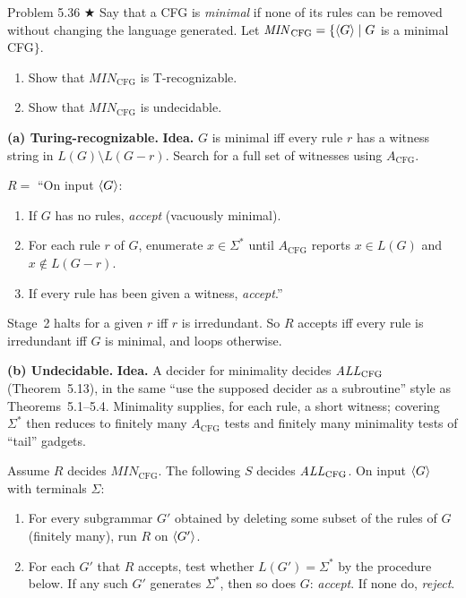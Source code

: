 \begin{question}{Problem 5.36 $\bigstar$}
Say that a CFG is \emph{minimal} if none of its rules can be removed without changing the language generated. Let $\mathit{MIN}_{\mathrm{CFG}}=\{\langle G\rangle\mid G$ is a minimal CFG$\}$.
\begin{enumerate}[label=\alph*.]
\item Show that $\mathit{MIN}_{\mathrm{CFG}}$ is T-recognizable.
\item Show that $\mathit{MIN}_{\mathrm{CFG}}$ is undecidable.
\end{enumerate}
\end{question}
\begin{soln}
\textbf{(a) Turing-recognizable.}
\textbf{Idea.} $G$ is minimal iff every rule $r$ has a witness string in $L(G)\setminus L(G-r)$. Search for a full set of witnesses using $A_{\mathrm{CFG}}$.

$R=$ ``On input $\langle G\rangle$:
\begin{enumerate}
\item If $G$ has no rules, \emph{accept} (vacuously minimal).
\item For each rule $r$ of $G$, enumerate $x\in\Sigma^*$ until $A_{\mathrm{CFG}}$ reports $x\in L(G)$ and $x\notin L(G-r)$.
\item If every rule has been given a witness, \emph{accept}.''
\end{enumerate}
Stage~2 halts for a given $r$ iff $r$ is irredundant. So $R$ accepts iff every rule is irredundant iff $G$ is minimal, and loops otherwise.

\textbf{(b) Undecidable.}
\textbf{Idea.} A decider for minimality decides $\mathit{ALL}_{\mathrm{CFG}}$ (Theorem~5.13), in the same ``use the supposed decider as a subroutine'' style as Theorems~5.1--5.4. Minimality supplies, for each rule, a short witness; covering $\Sigma^*$ then reduces to finitely many $A_{\mathrm{CFG}}$ tests and finitely many minimality tests of ``tail'' gadgets.

Assume $R$ decides $\mathit{MIN}_{\mathrm{CFG}}$. The following $S$ decides $\mathit{ALL}_{\mathrm{CFG}}$. On input $\langle G\rangle$ with terminals $\Sigma$:
\begin{enumerate}
\item For every subgrammar $G'$ obtained by deleting some subset of the rules of $G$ (finitely many), run $R$ on $\langle G'\rangle$.
\item For each $G'$ that $R$ accepts, test whether $L(G')=\Sigma^*$ by the procedure below. If any such $G'$ generates $\Sigma^*$, then so does $G$: \emph{accept}. If none do, \emph{reject}.
\end{enumerate}


\end{soln}
